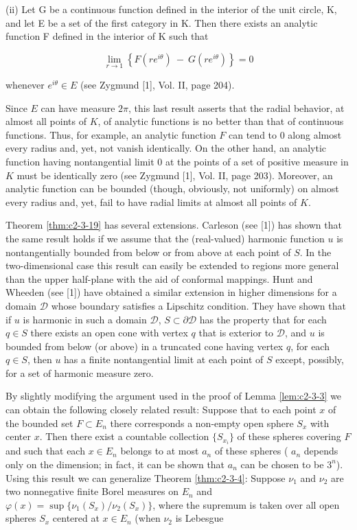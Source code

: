 (ii) Let G be a continuous function defined in the interior of the unit circle, K, and let E be a set of the first category in K. Then there exists an analytic function F defined in the interior of K such that

\[
\lim_{r\to1}\left\{F(r e^{i\theta})\:-\:G(r e^{i\theta})\right\}=0
\]

whenever $e^{i\theta} \in E$ (see Zygmund [1], Vol. II, page 204).

Since $E$ can have measure $2\pi$, this last result asserts that the radial behavior, at almost all points of $K$, of analytic functions is no better than that of continuous functions. Thus, for example, an analytic function $F$ can tend to 0 along almost every radius and, yet, not vanish identically. On the other hand, an analytic function having nontangential limit 0 at the points of a set of positive measure in $K$ must be identically zero (see Zygmund [1], Vol. II, page 203). Moreover, an analytic function can be bounded (though, obviously, not uniformly) on almost every radius and, yet, fail to have radial limits at almost all points of $K$.

 Theorem \ref{thm:c2-3-19} has several extensions. Carleson (see [1]) has shown that the same result holds if we assume that the (real-valued) harmonic function $u$ is nontangentially bounded from below or from above at each point of $S$. In the two-dimensional case this result can easily be extended to regions more general than the upper half-plane with the aid of conformal mappings. Hunt and Wheeden (see [1]) have obtained a similar extension in higher dimensions for a domain $\mathcal{D}$ whose boundary satisfies a Lipschitz condition. They have shown that if $u$ is harmonic in such a domain $\mathcal{D}$, $S \subset \partial \mathcal{D}$ has the property that for each $q \in S$ there exists an open cone with vertex $q$ that is exterior to $\mathcal{D}$, and $u$ is bounded from below (or above) in a truncated cone having vertex $q$, for each $q \in S$, then $u$ has a finite nontangential limit at each point of $S$ except, possibly, for a set of harmonic measure zero.

 By slightly modifying the argument used in the proof of Lemma \ref{lem:c2-3-3} we can obtain the following closely related result: Suppose that to each point $x$ of the bounded set $F \subset E_n$ there corresponds a non-empty open sphere $S_x$ with center $x$. Then there exist a countable collection $\{S_{x_i}\}$ of these spheres covering $F$ and such that each $x \in E_n$ belongs to at most $a_n$ of these spheres ( $a_n$ depends only on the dimension; in fact, it can be shown that $a_n$ can be chosen to be $3^n$). Using this result we can generalize Theorem \ref{thm:c2-3-4}: Suppose $\nu_1$ and $\nu_2$ are two nonnegative finite Borel measures on $E_n$ and $\varphi(x) = \sup\{\nu_1(S_x)/\nu_2(S_x)\}$, where the supremum is taken over all open spheres $S_x$ centered at $x \in E_n$ (when $\nu_2$ is Lebesgue

